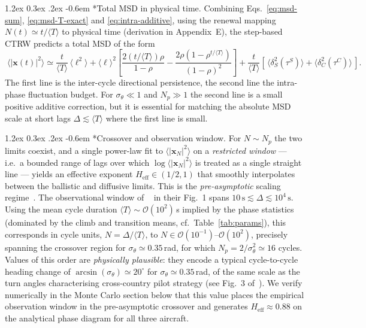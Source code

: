 \documentclass[11pt,a4paper]{article}
\makeatletter
\newenvironment{widetext}{}{}
\renewcommand\paragraph{\@startsection{paragraph}{4}{\z@}%
  {1.2ex \@plus 0.3ex \@minus .2ex}%
  {-0.6em}%
  {\normalfont\normalsize\itshape}}
\makeatother
\begin{document}
\paragraph*{Total MSD in physical time.}
Combining Eqs.~\eqref{eq:msd-sum}, \eqref{eq:msd-T-exact} and
\eqref{eq:intra-additive}, using the renewal mapping $N(t) \simeq
t/\langle T\rangle$ to physical time (derivation in
Appendix~E), the step-based CTRW predicts a total MSD of the form
\begin{widetext}
\begin{equation}
\boxed{\;
\langle |\mathbf{x}(t)|^2 \rangle
 \simeq \frac{t}{\langle T\rangle}\,\langle \ell^2\rangle
 + \langle\ell\rangle^2
   \left[\frac{2(t/\langle T\rangle)\rho}{1-\rho}
        - \frac{2\rho(1-\rho^{t/\langle T\rangle})}{(1-\rho)^2}\right]
 + \frac{t}{\langle T\rangle}
   \left[\,\langle\delta^2_S(\tau^S)\rangle
         + \langle\delta^2_C(\tau^C)\rangle\,\right].
\;}
\label{eq:msd-total}
\end{equation}
\end{widetext}
The first line is the inter-cycle directional persistence, the
second line the intra-phase fluctuation budget. For
$\sigma_\theta \ll 1$ and $N_p \gg 1$ the second line is a small
positive additive correction, but it is essential for matching the
absolute MSD scale at short lags $\Delta \lesssim \langle T\rangle$
where the first line is small.

\paragraph*{Crossover and observation window.}
For $N \sim N_p$ the two limits coexist, and a single power-law fit
to $\langle |\mathbf{x}_N|^2\rangle$ on a \emph{restricted window}
--- i.e.\ a bounded range of lags over which
$\log\langle|\mathbf{x}_N|^2\rangle$ is treated as a single straight
line --- yields an effective exponent
$H_{\mathrm{eff}} \in (1/2, 1)$ that smoothly interpolates between
the ballistic and diffusive limits. This is the \emph{pre-asymptotic}
scaling regime~\cite{meroz2015}. The observational window of
~\cite{vilpellet2026} in their Fig.~1 spans
$10\,\mathrm{s} \lesssim \Delta \lesssim 10^4\,\mathrm{s}$. Using
the mean cycle duration $\langle T \rangle \sim \mathcal{O}(10^2)$\,s
implied by the phase statistics (dominated by the climb and
transition means, cf.~Table~\ref{tab:params}), this corresponds in
cycle units, $N = \Delta/\langle T\rangle$, to
$N \in \mathcal{O}(10^{-1})$--$\mathcal{O}(10^2)$, precisely
spanning the crossover region for
$\sigma_\theta \simeq 0.35$\,rad, for which $N_p = 2/\sigma_\theta^2
\simeq 16$ cycles.
Values of this order are \emph{physically plausible}: they encode
a typical cycle-to-cycle heading change of
$\arcsin(\sigma_\theta) \simeq 20^\circ$ for $\sigma_\theta\simeq
0.35$\,rad, of the same scale as the turn angles characterising
cross-country pilot strategy (see Fig.~3 of~\cite{vilpellet2026}).
We verify numerically in the Monte Carlo section below that this
value places the empirical observation window in the pre-asymptotic
crossover and generates $H_{\mathrm{eff}} \approx 0.88$ on the
analytical phase diagram for all three aircraft.
\end{document}
